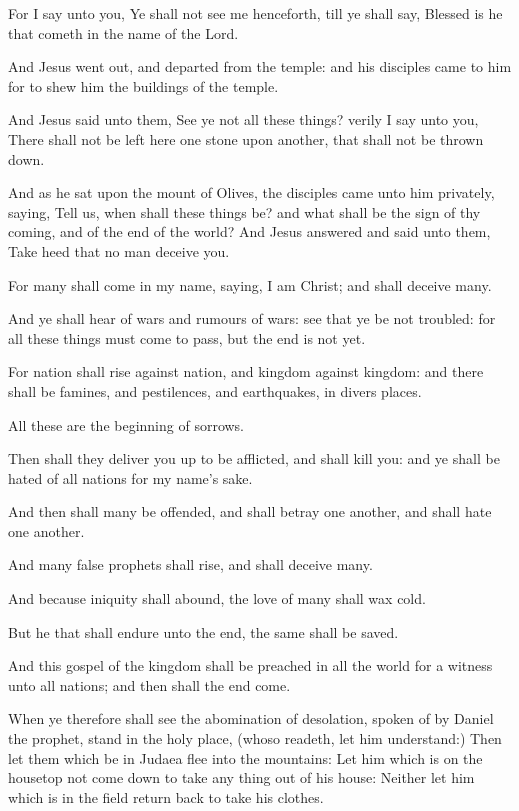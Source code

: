 \Verse For I say unto you, Ye shall not see me henceforth, till ye shall say, Blessed is he that cometh in the name of the Lord.


\Chapter
\Verse And Jesus went out, and departed from the temple: and his disciples came to him for to shew him the buildings of the temple.

\Verse And Jesus said unto them, See ye not all these things? verily I say unto you, There shall not be left here one stone upon another, that shall not be thrown down.

\Verse And as he sat upon the mount of Olives, the disciples came unto him privately, saying, Tell us, when shall these things be? and what shall be the sign of thy coming, and of the end of the world?  \Verse And Jesus answered and said unto them, Take heed that no man deceive you.

\Verse For many shall come in my name, saying, I am Christ; and shall deceive many.

\Verse And ye shall hear of wars and rumours of wars: see that ye be not troubled: for all these things must come to pass, but the end is not yet.

\Verse For nation shall rise against nation, and kingdom against kingdom: and there shall be famines, and pestilences, and earthquakes, in divers places.

\Verse All these are the beginning of sorrows.

\Verse Then shall they deliver you up to be afflicted, and shall kill you: and ye shall be hated of all nations for my name's sake.

\Verse And then shall many be offended, and shall betray one another, and shall hate one another.

\Verse And many false prophets shall rise, and shall deceive many.

\Verse And because iniquity shall abound, the love of many shall wax cold.

\Verse But he that shall endure unto the end, the same shall be saved.

\Verse And this gospel of the kingdom shall be preached in all the world for a witness unto all nations; and then shall the end come.

\Verse When ye therefore shall see the abomination of desolation, spoken of by Daniel the prophet, stand in the holy place, (whoso readeth, let him understand:) \Verse Then let them which be in Judaea flee into the mountains: \Verse Let him which is on the housetop not come down to take any thing out of his house: \Verse Neither let him which is in the field return back to take his clothes.

